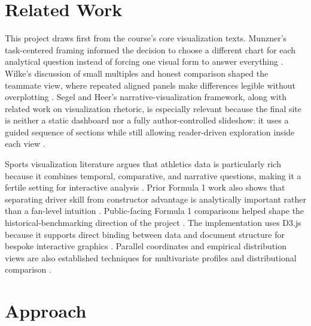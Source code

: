 \documentclass[conference]{IEEEtran}
\begin{document}
\section{Related Work}
This project draws first from the course's core visualization texts. Munzner's task-centered framing informed the decision to choose a different chart for each analytical question instead of forcing one visual form to answer everything \cite{munzner2014visualization}. Wilke's discussion of small multiples and honest comparison shaped the teammate view, where repeated aligned panels make differences legible without overplotting \cite{wilke2019fundamentals,tufte1983visual,cleveland1984graphical}. Segel and Heer's narrative-visualization framework, along with related work on visualization rhetoric, is especially relevant because the final site is neither a static dashboard nor a fully author-controlled slideshow: it uses a guided sequence of sections while still allowing reader-driven exploration inside each view \cite{segel2010narrative,hullman2011visualization,shneiderman1996eyes}.

Sports visualization literature argues that athletics data is particularly rich because it combines temporal, comparative, and narrative questions, making it a fertile setting for interactive analysis \cite{perin2018sports}. Prior Formula 1 work also shows that separating driver skill from constructor advantage is analytically important rather than a fan-level intuition \cite{vankesteren2023f1}. Public-facing Formula 1 comparisons helped shape the historical-benchmarking direction of the project \cite{seymour2023f1,sportschord2023verstappen}. The implementation uses D3.js because it supports direct binding between data and document structure for bespoke interactive graphics \cite{bostock2011d3,murray2017interactive}. Parallel coordinates and empirical distribution views are also established techniques for multivariate profiles and distributional comparison \cite{inselberg1985plane,wilks2011statistical}.

\section{Approach}
\end{document}

